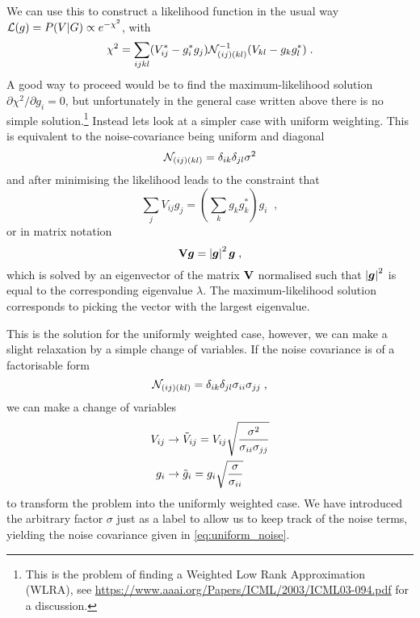 \documentclass[oldfontcommands,letter,11pt,oneside,article]{memoir}
\begin{document}
We can use this to construct a likelihood function in the usual way
$\mathcal{L}(g) = P(V \vert G) \propto e^{-\chi^2}$, with
\begin{equation}
    \chi^2 = \sum_{ijkl} (V^*_{ij} - g^*_i g_j) \mathcal{N}^{-1}_{(ij)(kl)} (V_{kl} - g_k g_l^*) \; .
\end{equation}
A good way to proceed would be to find the maximum-likelihood solution $\partial
\chi^2/\partial{g_i} = 0$, but unfortunately in the general case written above
there is no simple solution.\footnote{This is the problem of finding a Weighted
Low Rank Approximation (WLRA), see
\url{https://www.aaai.org/Papers/ICML/2003/ICML03-094.pdf} for a discussion.}
Instead lets look at a simpler case with uniform weighting. This is equivalent
to the noise-covariance being uniform and diagonal
\begin{equation}
    \label{eq:uniform_noise}
\mathcal{N}_{(ij)(kl)} = \delta_{ik} \delta_{jl} \sigma^2
\end{equation}
and after minimising the likelihood leads to the constraint that
\begin{equation}
\sum_j V_{ij} g_j = \left(\sum_k g_k g_k^*\right) g_i \; \; ,
\end{equation}
or in matrix notation
\begin{equation}
    \boldsymbol{\mathbf{V}} \boldsymbol{g} = \left\lvert \boldsymbol{g} \right\rvert^2 \boldsymbol{g} \; ,
\end{equation}
which is solved by an eigenvector of the matrix $\boldsymbol{\mathbf{V}}$ normalised such that $\left\lvert
\boldsymbol{g} \right\rvert^2$ is equal to the corresponding eigenvalue $\lambda$. The
maximum-likelihood solution corresponds to picking the vector with the largest
eigenvalue.

This is the solution for the uniformly weighted case, however, we can make a
slight relaxation by a simple change of variables. If the noise covariance is of
a factorisable form
\begin{equation}
\mathcal{N}_{(ij)(kl)} = \delta_{ik} \delta_{jl} \sigma_{ii} \sigma_{jj} \; ,
\end{equation}
we can make a change of variables
\begin{align}
    \label{eq:gain_transform}
    V_{ij} & \rightarrow \tilde{V}_{ij} = V_{ij} \sqrt{\frac{\sigma^2}{\sigma_{ii} \sigma_{jj}}} \notag \\
    g_i &    \rightarrow \tilde{g}_i = g_i \sqrt{\frac{\sigma}{\sigma_{ii}}}
\end{align}
to transform the problem into the uniformly weighted case. We have introduced
the arbitrary factor $\sigma$ just as a label to allow us to keep track of the
noise terms, yielding the noise covariance given in \eqref{eq:uniform_noise}.
\end{document}
